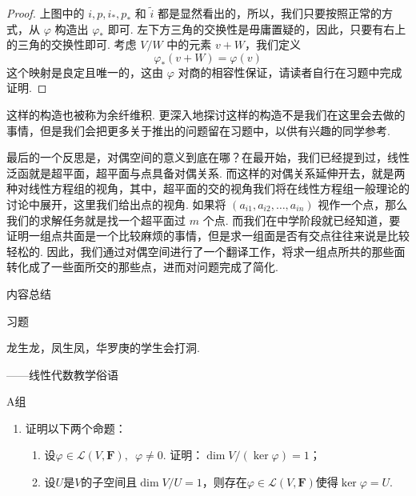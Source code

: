 \begin{proof}
    上图中的 $i, p, i_*, p_*$ 和 $\tilde{i}$ 都是显然看出的，所以，我们只要按照正常的方式，从 $\varphi$ 构造出 $\varphi_*$ 即可. 左下方三角的交换性是毋庸置疑的，因此，只要有右上的三角的交换性即可. 考虑 $V/W$ 中的元素 $v + W$，我们定义
    \[
    \varphi_*(v + W) = \varphi(v)
    \]
    这个映射是良定且唯一的，这由 $\varphi$ 对商的相容性保证，请读者自行在习题中完成证明.
\end{proof}

这样的构造也被称为余纤维积. 更深入地探讨这样的构造不是我们在这里会去做的事情，但是我们会把更多关于推出的问题留在习题中，以供有兴趣的同学参考.

最后的一个反思是，对偶空间的意义到底在哪？在最开始，我们已经提到过，线性泛函就是超平面，超平面与点具备对偶关系. 而这样的对偶关系延伸开去，就是两种对线性方程组的视角，其中，超平面的交的视角我们将在线性方程组一般理论的讨论中展开，这里我们给出点的视角. 如果将 $(a_{i1}, a_{i2},\ldots, a_{in})$ 视作一个点，那么我们的求解任务就是找一个超平面过 $m$ 个点. 而我们在中学阶段就已经知道，要证明一组点共面是一个比较麻烦的事情，但是求一组面是否有交点往往来说是比较轻松的. 因此，我们通过对偶空间进行了一个翻译工作，将求一组点所共的那些面转化成了一些面所交的那些点，进而对问题完成了简化.

\vspace{2ex}
\centerline{\heiti \Large 内容总结}



\vspace{2ex}
\centerline{\heiti \Large 习题}

\vspace{2ex}
{\kaishu 龙生龙，凤生凤，华罗庚的学生会打洞.}
\begin{flushright}
    \kaishu
    ——线性代数教学俗语
\end{flushright}

\centerline{\heiti A组}
\begin{enumerate}
    \item 证明以下两个命题：
        \begin{enumerate}
            \item 设$\varphi\in \mathcal{L}(V,\mathbf{F}),\enspace\varphi\neq 0$. 证明：$\dim V/(\ker\varphi)=1$；

            \item 设$U$是$V$的子空间且$\dim V/U=1$，则存在$\varphi\in \mathcal{L}(V,\mathbf{F})$使得$\ker\varphi=U$.
        \end{enumerate}
\end{enumerate}

